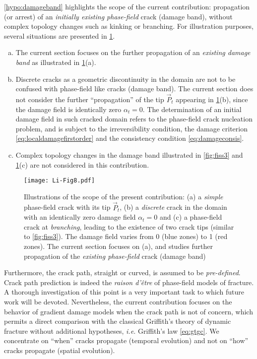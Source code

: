 \begin{remark}
\cref{hypo:damageband} highlights the scope of the current contribution: propagation (or arrest) of an \emph{initially existing phase-field} crack (damage band), without complex topology changes such as kinking or branching. For illustration purposes, several situations are presented in \cref{fig:examples}.
\begin{enumerate}[(a)]
\item The current section focuses on the further propagation of an \emph{existing damage band} as illustrated in \cref{fig:examples}(a).

\item Discrete cracks as a geometric discontinuity in the domain are not to be confused with phase-field like cracks (damage band). The current section does not consider the further ``propagation'' of the tip $\vec{P}_t$ appearing in \cref{fig:examples}(b), since the damage field is identically zero $\alpha_t=0$. The determination of an initial damage field in such cracked domain refers to the phase-field crack nucleation problem, and is subject to the irreversibility condition, the damage criterion \eqref{eq:localdamagefirstorder} and the consistency condition \eqref{eq:damageconsis}.

\item Complex topology changes in the damage band illustrated in \cref{fig:fiss3} and \cref{fig:examples}(c) are not considered in this contribution.
\end{enumerate}

\begin{figure}[htbp]
\centering
\texttt{[image: Li-Fig8.pdf]}
\caption{Illustrations of the scope of the present contribution: (a) a \emph{simple} phase-field crack with its tip $\vec{P}_t$, (b) a \emph{discrete} crack in the domain with an identically zero damage field $\alpha_t=0$ and (c) a phase-field crack at \emph{branching}, leading to the existence of two crack tips (similar to \cref{fig:fiss3}). The damage field varies from 0 (blue zones) to 1 (red zones). The current section focuses on (a), and studies further propagation of the \emph{existing phase-field} crack (damage band)} \label{fig:examples}
\end{figure}

Furthermore, the crack path, straight or curved, is assumed to be \emph{pre-defined}. Crack path prediction is indeed the \emph{raison d'être} of phase-field models of fracture. A thorough investigation of this point is a very important task to which future work will be devoted. Nevertheless, the current contribution focuses on the behavior of gradient damage models when the crack path is not of concern, which permits a direct comparison with the classical Griffith's theory of dynamic fracture without additional hypotheses, \emph{i.e.} Griffith's law \eqref{eq:gtgc}. We concentrate on ``when'' cracks propagate (temporal evolution) and not on ``how'' cracks propagate (spatial evolution).
\end{remark}

